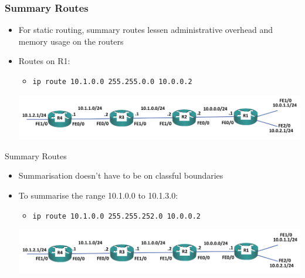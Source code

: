 \documentclass[pdflatex,compress,mathserif]{beamer}
\begin{document}
\begin{frame}
	\frametitle{Summary Routes}
	\begin{itemize}
		\item For static routing, summary routes lessen administrative overhead and memory usage on the routers
		\item Routes on R1:
		\begin{itemize}
			\item[] \texttt{ip route 10.1.0.0 255.255.0.0 10.0.0.2}
		\end{itemize}
		\begin{center}
			\includegraphics[width=\linewidth]{img/img07}
		\end{center}
	\end{itemize}
\end{frame}

\begin{frame}{Summary Routes}
	\begin{itemize}
		\item Summarisation doesn’t have to be on classful boundaries
		\item To summarise the range 10.1.0.0 to 10.1.3.0:
		\begin{itemize}
			\item[] \texttt{ip route 10.1.0.0 255.255.252.0 10.0.0.2}
		\end{itemize}
		\begin{center}
			\includegraphics[width=\linewidth]{img/img08}
		\end{center}
	\end{itemize}
\end{frame}
\end{document}

